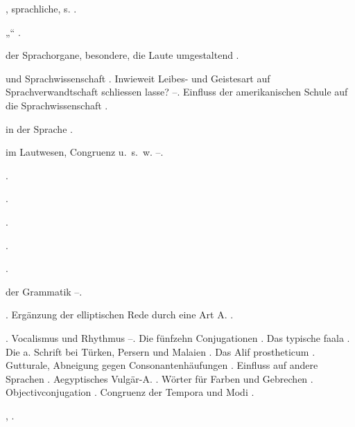 \begin{register}
, sprachliche, s. .

„“ \pageref{sp.232}.

 der Sprachorgane, besondere, die Laute umgestaltend \pageref{sp.183}.

 und Sprachwissenschaft \pageref{sp.13}. Inwieweit Leibes- und Geistesart auf Sprachverwandtschaft schliessen lasse? \pageref{sp.147}–\pageref{sp.148}. Einfluss der amerikanischen Schule auf die Sprachwissenschaft \pageref{sp.159}.

 in der Sprache \pageref{sp.2}.


 im Lautwesen, Congruenz u.~s.~w. \pageref{sp.401}–\pageref{sp.403}.

.

 \pageref{sp.119}.



 \pageref{sp.201}.


 \pageref{sp.201}.

 \pageref{sp.21}.

 der Grammatik \pageref{sp.106}–\pageref{sp.107}.

 \pageref{sp.101}. Ergänzung der elliptischen Rede durch eine Art A. \pageref{sp.375}.

. Vocalismus und Rhythmus \pageref{sp.92}–\pageref{sp.93}. Die fünfzehn Conjugationen \pageref{sp.116}. Das typische fa{\ain}ala \pageref{sp.117}. Die a. Schrift bei Türken, Persern und Malaien \pageref{sp.129}. Das Alif prostheticum \pageref{sp.157}. Gutturale, Abneigung gegen Consonantenhäufungen \pageref{sp.197}.  Einfluss auf andere Sprachen \pageref{sp.271}. Aegyptisches Vulgär-A. \pageref{sp.276}.  Wörter für Farben und Gebrechen \pageref{sp.441}. Objectivconjugation \pageref{sp.460}. Congruenz der Tempora und Modi \pageref{sp.466}.

 \pageref{sp.149}, \pageref{sp.257}.


\end{register}
